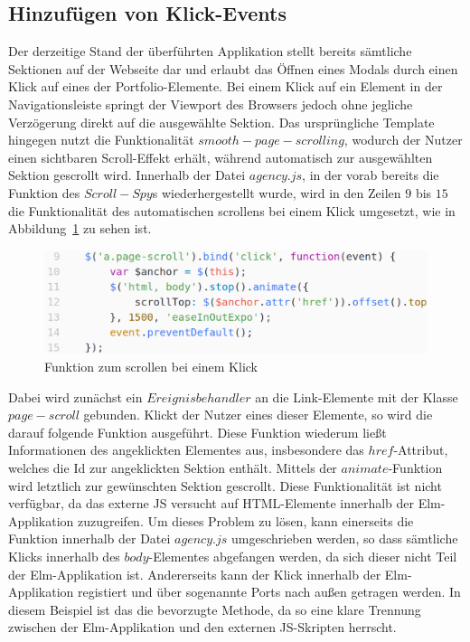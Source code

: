 \subsection{Hinzufügen von Klick-Events}
\label{sec:erweiterung-clicks}
Der derzeitige Stand der überführten Applikation stellt bereits sämtliche Sektionen auf der Webseite dar und erlaubt das Öffnen eines Modals durch einen Klick auf eines der Portfolio-Elemente. Bei einem Klick auf ein Element in der Navigationsleiste springt der Viewport des Browsers jedoch ohne jegliche Verzögerung direkt auf die ausgewählte Sektion. Das ursprüngliche Template hingegen nutzt die Funktionalität $smooth-page-scrolling$, wodurch der Nutzer einen sichtbaren Scroll-Effekt erhält, während automatisch zur ausgewählten Sektion gescrollt wird. Innerhalb der Datei $agency.js$, in der vorab bereits die Funktion des $Scroll-Spy$s wiederhergestellt wurde, wird in den Zeilen $9$ bis $15$ die Funktionalität des automatischen scrollens bei einem Klick umgesetzt, wie in Abbildung~\ref{fig:non-functional-scrolling} zu sehen ist.
\begin{figure}[h]
\centering
\includegraphics[scale=0.37]{img/non-functional-scrolling}
\caption{Funktion zum scrollen bei einem Klick}\label{fig:non-functional-scrolling}
\end{figure}
Dabei wird zunächst ein $Ereignisbehandler$ an die Link-Elemente mit der Klasse $page-scroll$ gebunden. Klickt der Nutzer eines dieser Elemente, so wird die darauf folgende Funktion ausgeführt. Diese Funktion wiederum ließt Informationen des angeklickten Elementes aus, insbesondere das $href$-Attribut, welches die Id zur angeklickten Sektion enthält. Mittels der $animate$-Funktion wird letztlich zur gewünschten Sektion gescrollt.
Diese Funktionalität ist nicht verfügbar, da das externe \ac{JS} versucht auf \ac{HTML}-Elemente innerhalb der Elm-Applikation zuzugreifen. Um dieses Problem zu lösen, kann einerseits die Funktion innerhalb der Datei $agency.js$ umgeschrieben werden, so dass sämtliche Klicks innerhalb des $body$-Elementes abgefangen werden, da sich dieser nicht Teil der Elm-Applikation ist. Andererseits kann der Klick innerhalb der Elm-Applikation registiert und über sogenannte Ports nach außen getragen werden. In diesem Beispiel ist das die bevorzugte Methode, da so eine klare Trennung zwischen der Elm-Applikation und den externen \ac{JS}-Skripten herrscht.

